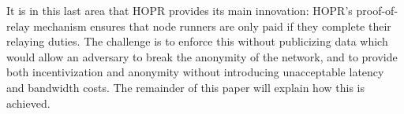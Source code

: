 It is in this last area that HOPR provides its main innovation: HOPR's proof-of-relay mechanism ensures that node runners are only paid if they complete their relaying duties. The challenge is to enforce this without publicizing data which would allow an adversary to break the anonymity of the network, and to provide both incentivization and anonymity without introducing unacceptable latency and bandwidth costs. The remainder of this paper will explain how this is achieved.
